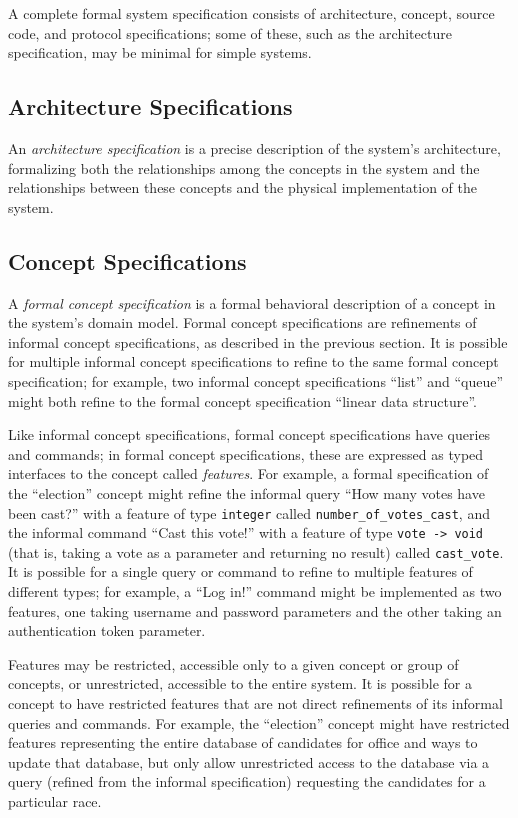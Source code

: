 A complete formal system specification consists of architecture,
concept, source code, and protocol specifications; some of these, such
as the architecture specification, may be minimal for simple
systems.

\subsection{Architecture Specifications}

An \emph{architecture specification} is a precise description of the
system's architecture, formalizing both the relationships among the
concepts in the system and the relationships between these concepts
and the physical implementation of the system. 


\subsection{Concept Specifications}

A \emph{formal concept specification} is a formal behavioral
description of a concept in the system's domain model. Formal concept
specifications are refinements of informal concept specifications, as
described in the previous section. It is possible for multiple
informal concept specifications to refine to the same formal concept
specification; for example, two informal concept specifications
``list'' and ``queue'' might both refine to the formal concept
specification ``linear data structure''.

Like informal concept specifications, formal concept specifications
have queries and commands; in formal concept specifications, these are
expressed as typed interfaces to the concept called
\emph{features}. For example, a formal specification of the
``election'' concept might refine the informal query ``How many votes
have been cast?'' with a feature of type \texttt{integer} called
\texttt{number\_of\_votes\_cast}, and the informal command ``Cast this
vote!'' with a feature of type \texttt{vote -> void} (that is, taking
a vote as a parameter and returning no result) called
\texttt{cast\_vote}. It is possible for a single query or command to
refine to multiple features of different types; for example, a ``Log
in!''  command might be implemented as two features, one taking
username and password parameters and the other taking an
authentication token parameter.

Features may be restricted, accessible only to a given concept or
group of concepts, or unrestricted, accessible to the entire
system. It is possible for a concept to have restricted features that
are not direct refinements of its informal queries and commands. For
example, the ``election'' concept might have restricted features
representing the entire database of candidates for office and ways to
update that database, but only allow unrestricted access to the
database via a query (refined from the informal specification)
requesting the candidates for a particular race.

